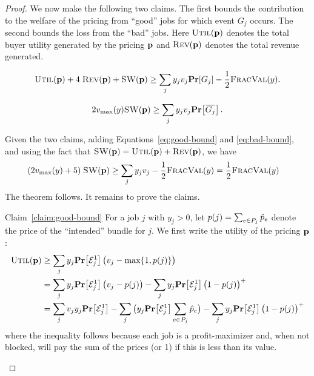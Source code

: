 \begin{proof}
We now make the following two claims. The first bounds the
contribution to the welfare of the pricing from ``good'' jobs for
which event $G_j$ occurs. The second bounds the loss from the ``bad''
jobs. Here ${\normalfont\textsc{Util}}(\mathbf{p})$ denotes the total buyer utility generated
by the pricing $\mathbf{p}$ and ${\normalfont\textsc{Rev}}(\mathbf{p})$ denotes the total revenue
generated.

\begin{claim}
\label{claim:good-bound}
\begin{equation}
  \label{eq:good-bound}
     \util(\prices) + 4\;\rev(\prices) + \sw(\prices) \ge \sum_jy_j\valj\prob{G_j} - \half\fval(y). 
\end{equation}
\end{claim}

\begin{claim}
\label{claim:bad-bound}
\begin{equation}
  \label{eq:bad-bound}
  2\vmax(y)\sw(\prices) \ge \sum_j y_j\valj \prob{\overbar{G_j}}. 
\end{equation}
\end{claim}

\noindent
Given the two claims, adding Equations~\eqref{eq:good-bound} and
\eqref{eq:bad-bound}, and using the fact that
${\normalfont\textsc{SW}}(\mathbf{p}) = {\normalfont\textsc{Util}}(\mathbf{p}) + {\normalfont\textsc{Rev}}(\mathbf{p}) $, we have
    \begin{align*}
        (2v_{\max}(y) + 5)\;{\normalfont\textsc{SW}}(\mathbf{p}) &\ge \sum_j y_jv_{j} - \frac12{\normalfont\textsc{FracVal}}(y)
        = \frac12{\normalfont\textsc{FracVal}}(y)
    \end{align*}
The theorem follows. It remains to prove the claims.

\begin{proofof}{Claim~\ref{claim:good-bound}}
  For a job $j$ with $y_j>0$, let $p(j) = \sum_{e\in P_j} \hat{p}_e$
  denote the price of the ``intended'' bundle for $j$. We first write
  the utility of the pricing $\mathbf{p}$:
  \begin{align}
    \util(\prices) &\ge \sum_j y_j \prob{\mathcal E^1_j}
                     \big(\valj - \max\{1, p(j)\}\big) \nonumber \\
                   &= \sum_j y_j \prob{\mathcal E^1_j} \big(\valj - p(j)\big) -
                     \sum_j y_j \prob{\mathcal E^1_j}\big(1 - p(j)\big)^+\nonumber\\
                  &= \sum_j \valj y_j \prob{\mathcal E^1_j} - \sum_j
                    \big(y_j \prob{\mathcal E^1_j} \sum_{e\in P_j} \phat_e\big) -
                     \sum_j y_j \prob{\mathcal E^1_j}\big(1 - p(j)\big)^+
                     \label{eq:pricing-util-lb}
  \end{align}
  where the inequality follows because each job is a profit-maximizer
  and, when not blocked, will pay the sum of the prices (or 1) if this
  is less than its value.


\end{proofof}
\end{proof}
